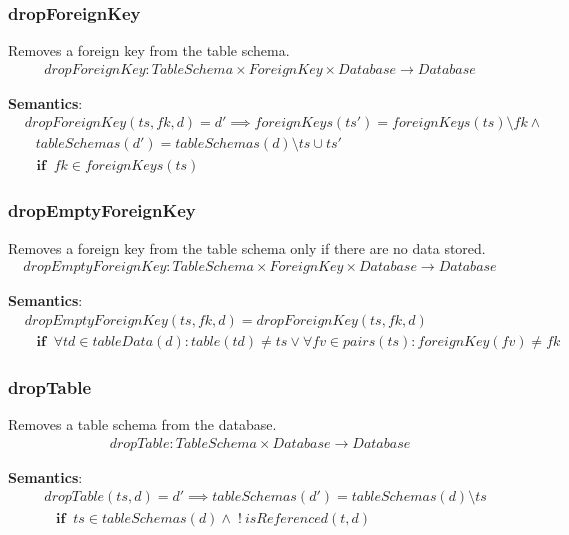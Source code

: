\documentclass[10pt]{article}
\begin{document}
\subsubsection{dropForeignKey}
Removes a foreign key from the table schema.
\begin{align}
dropForeignKey: TableSchema \times ForeignKey \times Database \rightarrow Database
\end{align}

\noindent \textbf{Semantics}:
\begin{align}
& dropForeignKey(ts, fk, d) = d' \implies foreignKeys(ts') = foreignKeys(ts) \setminus fk \land \nonumber \\
& \;\;\ tableSchemas(d') = tableSchemas(d) \setminus ts \cup ts'  \nonumber \\
& \;\;\; \mathbf{if}  \;\; fk \in foreignKeys(ts)
\end{align}

\subsubsection{dropEmptyForeignKey}
Removes a foreign key from the table schema only if there are no data stored.
\begin{align}
dropEmptyForeignKey: TableSchema \times ForeignKey \times Database \rightarrow Database
\end{align}

\noindent \textbf{Semantics}:
\begin{align}
& dropEmptyForeignKey(ts, fk, d) = dropForeignKey(ts, fk, d) \nonumber \\
& \;\;\; \mathbf{if}  \;\;  \forall td \in tableData(d) : table(td) \neq ts \lor \forall fv \in pairs(ts) : foreignKey(fv) \neq fk
\end{align}

\subsubsection{dropTable}
Removes a table schema from the database.
\begin{align}
dropTable: TableSchema \times Database \rightarrow Database
\end{align}

\noindent \textbf{Semantics}:
\begin{align}
& dropTable(ts, d) = d' \implies tableSchemas(d') = tableSchemas(d) \setminus ts  \nonumber \\
& \;\;\; \mathbf{if}  \;\; ts \in tableSchemas(d) \land \; ! \: isReferenced(t, d)
\end{align}
\end{document}
